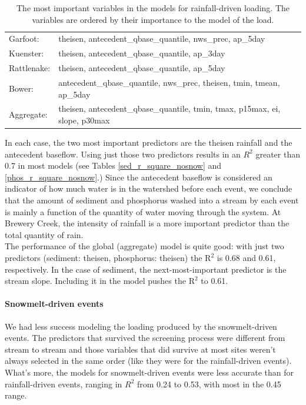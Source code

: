 \documentclass[10pt]{article}
\begin{document}
\begin{table}[h!]
\begin{center}
\begin{tabular}{ll}
        \hspace{5mm} Garfoot: & theisen, antecedent\_qbase\_quantile, nws\_prec, ap\_5day\\
        \hspace{5mm} Kuenster: & theisen, antecedent\_qbase\_quantile, ap\_3day\\
        \hspace{5mm} Rattlenake: & theisen, antecedent\_qbase\_quantile, ap\_5day\\
        \hspace{5mm} Bower: & antecedent\_qbase\_quantile, nws\_prec, theisen, tmin, tmean, ap\_5day\\
        \hspace{5mm} Aggregate: & theisen, antecedent\_qbase\_quantile, tmin, tmax, p15max, ei, slope, p30max\\
    \end{tabular}
    \caption{The most important variables in the models for rainfall-driven loading. The variables are ordered by their importance to the model of the load. \label{nosnow_predictor_list}}
    \end{center}
\end{table}

In each case, the two most important predictors are the theisen rainfall and the antecedent baseflow. Using just those two predictors results in an $R^2$ greater than 0.7 in most models (see Tables \ref{sed_r_square_nosnow} and \ref{phos_r_square_nosnow}.) Since the antecedent baseflow is considered an indicator of how much water is in the watershed before each event, we conclude that the amount of sediment and phosphorus washed into a stream by each event is mainly a function of the quantity of water moving through the system. At Brewery Creek, the intensity of rainfall is a more important predictor than the total quantity of rain.\\

The performance of the global (aggregate) model is quite good: with just two predictors (sediment: theisen, phosphorus: theisen) the $\text{R}^2$ is 0.68 and 0.61, respectively. In the case of sediment, the next-most-important predictor is the stream slope. Including it in the model pushes the $\text{R}^2$ to 0.61.\\

\paragraph{Snowmelt-driven events} We had less success modeling the loading produced by the snowmelt-driven events. The predictors that survived the screening process were different from stream to stream and those variables that did survive at most sites weren't always selected in the same order (like they were for the rainfall-driven events). What's more, the models for snowmelt-driven events were less accurate than for rainfall-driven events, ranging in $R^2$ from 0.24 to 0.53, with most in the 0.45 range.\\
\end{document}

